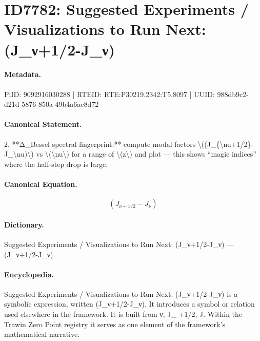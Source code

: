 \section*{ID7782: Suggested Experiments / Visualizations to Run Next: (J\_ν+1/2-J\_ν)}
\paragraph{Metadata.}
PiID: 9092916030288 | RTEID: RTE:P30219.2342:T5.8097 | UUID: 988db9c2-d21d-5876-850a-49b4a6ae8d72

\paragraph{Canonical Statement.}
2. **Δ\_Bessel spectral fingerprint:** compute modal factors \textbackslash{}((J\_\{\textbackslash{}nu+1/2\}-J\_\textbackslash{}nu)\textbackslash{}) vs \textbackslash{}(\textbackslash{}nu\textbackslash{}) for a range of \textbackslash{}(z\textbackslash{}) and plot — this shows “magic indices” where the half-step drop is large.

\paragraph{Canonical Equation.}
\[
(J_{\nu+1/2}-J_\nu)
\]

\paragraph{Dictionary.}
Suggested Experiments / Visualizations to Run Next: (J\_ν+1/2-J\_ν) — (J\_ν+1/2-J\_ν)

\paragraph{Encyclopedia.}
Suggested Experiments / Visualizations to Run Next: (J\_ν+1/2-J\_ν) is a symbolic expression, written (J\_ν+1/2-J\_ν). It introduces a symbol or relation used elsewhere in the framework. It is built from ν, J\_ +1/2, J. Within the Trawin Zero Point registry it serves as one element of the framework's mathematical narrative.
